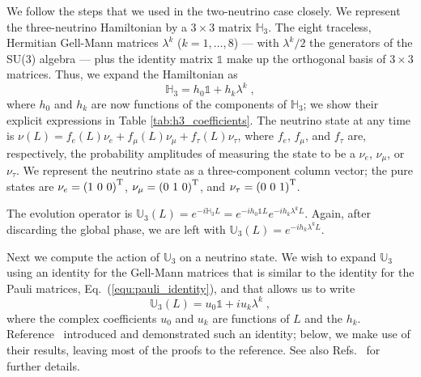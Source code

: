 \documentclass[final,5p,times,twocolumn]{elsarticle}
\newcommand{\eq}{Eq.}
\newcommand{\Refs}{Refs.}
\newcommand{\equ}[1]{\eq~(\ref{equ:#1})}
\begin{document}
We follow the steps that we used in the two-neutrino case closely.  We represent the three-neutrino Hamiltonian by a $3 \times 3$ matrix $\mathbb{H}_3$.  The eight traceless, Hermitian Gell-Mann matrices $\lambda^k$ ($k=1,\ldots,8$) --- with $\lambda^k/2$ the generators of the SU(3) algebra --- plus the identity matrix $\mathbb{1}$ make up the orthogonal basis of $3 \times 3$ matrices.  Thus, we expand the Hamiltonian as
\begin{equation}
 \label{equ:h3_expansion}
 \mathbb{H}_3 = h_0 \mathbb{1} + h_k \lambda^k \;,
\end{equation}
where $h_0$ and $h_k$ are now functions of the components of $\mathbb{H}_3$; we show their explicit expressions in Table \ref{tab:h3_coefficients}.  The neutrino state at any time is $\nu(L) = f_e(L) \nu_e + f_\mu(L) \nu_\mu + f_\tau(L) \nu_\tau$, where $f_e$, $f_\mu$, and $f_\tau$ are, respectively, the probability amplitudes of measuring the state to be a $\nu_e$, $\nu_\mu$, or $\nu_\tau$.  We represent the neutrino state as a three-component column vector; the pure states are $\nu_e = \left(1~0~0\right)^{\rm T}$, $\nu_\mu=\left(0~1~0\right)^{\rm T}$, and $\nu_\tau=\left(0~0~1\right)^{\rm T}$. 

The evolution operator is $\mathbb{U}_3\left(L\right) = e^{-i \mathbb{H}_3 L} = e^{-ih_0\mathbb{1}L}e^{-ih_k\lambda^kL}$.   Again, after discarding the global phase, we are left with $\mathbb{U}_3\left(L\right) = e^{-ih_k\lambda^kL}$.  

Next we compute the action of $\mathbb{U}_3$ on a neutrino state.  We wish to expand $\mathbb{U}_3$ using an identity for the Gell-Mann matrices that is similar to the identity for the Pauli matrices, \equ{pauli_identity}, and that allows us to write
\begin{equation}
 \label{equ:u3_def}
 \mathbb{U}_3\left(L\right) 
 = 
 u_0 \mathbb{1} + i u_k \lambda^k \;,
\end{equation}
where the complex coefficients $u_0$ and $u_k$ are functions of $L$ and the $h_k$.  Reference\ \cite{MacFarlane:1968vc} introduced and demonstrated such an identity; below, we make use of their results, leaving most of the proofs to the reference.  See also \Refs\ \cite{Lehrer-Ilamed:1964, Rosen:1971nt, Torruella:1975, Kusnezov:1995, Curtright:2015iba, VanKortryk:2015kua} for further details.
\end{document}
